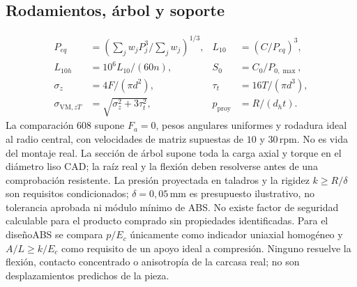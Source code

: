 \subsection{Rodamientos, árbol y soporte}
\begin{align}
P_{eq}&=\left(\sum_jw_jP_j^3/\sum_jw_j\right)^{1/3},&L_{10}&=(C/P_{eq})^3,\\
L_{10h}&=10^6L_{10}/(60n),&S_0&=C_0/P_{0,\max},\\
\sigma_z&=4F/(\pi d^2),&\tau_t&=16T/(\pi d^3),\\
\sigma_{\mathrm{VM},zT}&=\sqrt{\sigma_z^2+3\tau_t^2},&p_{\mathrm{proy}}&=R/(d_h t).
\end{align}
La comparación 608 supone $F_a=0$, pesos angulares uniformes y rodadura ideal al radio central,
con velocidades de matriz supuestas de $10$ y $30\,\mathrm{rpm}$. No es vida del montaje real.
La sección de árbol supone toda la carga axial y torque en el diámetro liso CAD;
la raíz real y la flexión deben resolverse antes de una comprobación resistente.
La presión proyectada en taladros y la rigidez $k\geq R/\delta$ son requisitos condicionados;
$\delta=0,05\,\mathrm{mm}$ es presupuesto ilustrativo, no tolerancia aprobada ni módulo mínimo de ABS.
No existe factor de seguridad calculable para el producto comprado sin propiedades identificadas.
Para el diseñoABS se compara $p/E_c$ únicamente como indicador uniaxial homogéneo y
$A/L\geq k/E_c$ como requisito de un apoyo ideal a compresión. Ninguno resuelve la flexión,
contacto concentrado o anisotropía de la carcasa real; no son desplazamientos predichos de la pieza.
